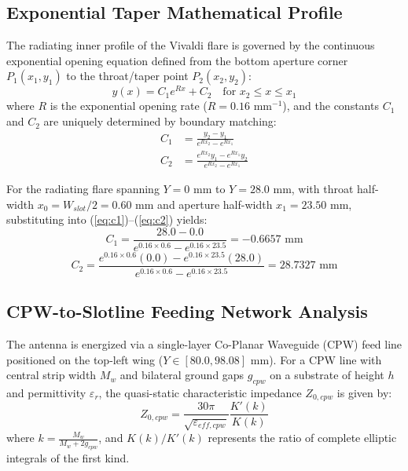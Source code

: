 \documentclass[journal,compsoc,twocolumn,10pt]{IEEEtran}
\begin{document}
\subsection{Exponential Taper Mathematical Profile}
The radiating inner profile of the Vivaldi flare is governed by the continuous exponential opening equation defined from the bottom aperture corner $P_1(x_1, y_1)$ to the throat/taper point $P_2(x_2, y_2)$:
\begin{equation}
y(x) = C_1 e^{R x} + C_2 \quad \text{for } x_2 \le x \le x_1
\label{eq:flare}
\end{equation}
where $R$ is the exponential opening rate ($R = 0.16\text{ mm}^{-1}$), and the constants $C_1$ and $C_2$ are uniquely determined by boundary matching:
\begin{align}
C_1 &= \frac{y_2 - y_1}{e^{R x_2} - e^{R x_1}} \label{eq:c1} \\
C_2 &= \frac{e^{R x_2} y_1 - e^{R x_1} y_2}{e^{R x_2} - e^{R x_1}} \label{eq:c2}
\end{align}

For the radiating flare spanning $Y = 0\text{ mm}$ to $Y = 28.0\text{ mm}$, with throat half-width $x_0 = W_{slot}/2 = 0.60\text{ mm}$ and aperture half-width $x_1 = 23.50\text{ mm}$, substituting into (\ref{eq:c1})--(\ref{eq:c2}) yields:
\begin{equation}
C_1 = \frac{28.0 - 0.0}{e^{0.16 \times 0.6} - e^{0.16 \times 23.5}} = -0.6657\text{ mm}
\end{equation}
\begin{equation}
C_2 = \frac{e^{0.16 \times 0.6}(0.0) - e^{0.16 \times 23.5}(28.0)}{e^{0.16 \times 0.6} - e^{0.16 \times 23.5}} = 28.7327\text{ mm}
\end{equation}

\subsection{CPW-to-Slotline Feeding Network Analysis}
The antenna is energized via a single-layer Co-Planar Waveguide (CPW) feed line positioned on the top-left wing ($Y \in [80.0, 98.08]\text{ mm}$). For a CPW line with central strip width $M_w$ and bilateral ground gaps $g_{cpw}$ on a substrate of height $h$ and permittivity $\varepsilon_r$, the quasi-static characteristic impedance $Z_{0,cpw}$ is given by:
\begin{equation}
Z_{0,cpw} = \frac{30\pi}{\sqrt{\varepsilon_{eff,cpw}}} \frac{K'(k)}{K(k)}
\label{eq:cpw_z0}
\end{equation}
where $k = \frac{M_w}{M_w + 2 g_{cpw}}$, and $K(k)/K'(k)$ represents the ratio of complete elliptic integrals of the first kind.
\end{document}
